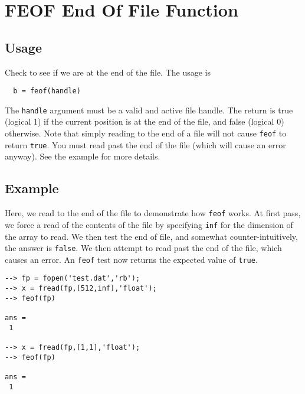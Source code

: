 \section{FEOF End Of File Function}

\subsection{Usage}

Check to see if we are at the end of the file.  The usage is
\begin{verbatim}
  b = feof(handle)
\end{verbatim}
The \verb|handle| argument must be a valid and active file handle.  The
return is true (logical 1) if the current position is at the end of
the file, and false (logical 0) otherwise.  Note that simply reading
to the end of a file will not cause \verb|feof| to return \verb|true|.  
You must read past the end of the file (which will cause an error 
anyway).  See the example for more details.
\subsection{Example}

Here, we read to the end of the file to demonstrate how \verb|feof| works.
At first pass, we force a read of the contents of the file by specifying
\verb|inf| for the dimension of the array to read.  We then test the
end of file, and somewhat counter-intuitively, the answer is \verb|false|.
We then attempt to read past the end of the file, which causes an
error.  An \verb|feof| test now returns the expected value of \verb|true|.
\begin{verbatim}
--> fp = fopen('test.dat','rb');
--> x = fread(fp,[512,inf],'float');
--> feof(fp)

ans = 
 1 

--> x = fread(fp,[1,1],'float');
--> feof(fp)

ans = 
 1 
\end{verbatim}
